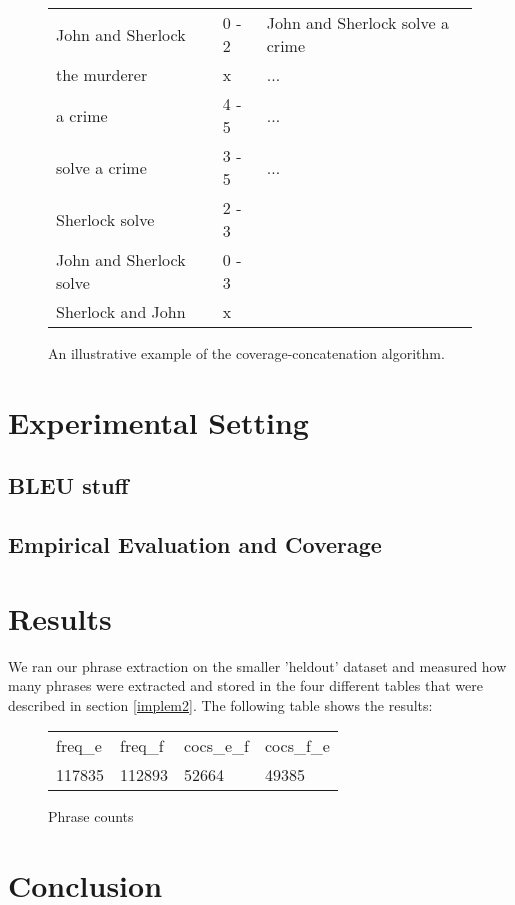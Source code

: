 \documentclass[11pt]{article}
\begin{document}
\begin{figure}
    \begin{tabular}{l|l|l}
    John and Sherlock       & 0 - 2 & John and Sherlock solve a crime \\
    the murderer            & x     & ...                             \\
    a crime                 & 4 - 5 & ...                             \\
    solve a crime           & 3 - 5 & ...                             \\
    Sherlock solve          & 2 - 3 & ~                               \\
    John and Sherlock solve & 0 - 3 & ~                               \\
    Sherlock and John       & x     & ~                               \\
    \end{tabular}
\caption{An illustrative example of the coverage-concatenation algorithm.}
    \label{algorithm}
\end{figure}

\section{Experimental Setting}

\subsection{BLEU stuff}

\subsection{Empirical Evaluation and Coverage}
\label{eval}

\section{Results}
We ran our phrase extraction on the smaller 'heldout' dataset and measured how many phrases were extracted and stored in the four different tables that were described in section \ref{implem2}. The following table shows the results:

\begin{figure}[H]
    \begin{tabular}{l|l|l|l}
    freq\_e  & freq\_f & cocs\_e\_f  & cocs\_f\_e \\
    117835 & 112893 & 52664 & 49385 \\
    \end{tabular}
\caption{Phrase counts}
\end{figure}


\section{Conclusion}


\end{document}

